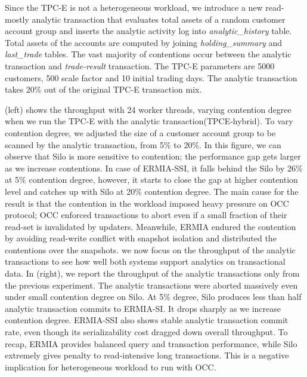 Since the TPC-E is not a heterogeneous workload, we introduce a new read-mostly analytic transaction that evaluates total assets of a random customer account group and inserts the analytic activity log into \textit{analytic\_history} table. Total assets of the accounts are computed by joining \textit{holding\_summary} and \textit{last\_trade} tables. The vast majority of contentions occur between the analytic transaction and \textit{trade-result} transaction. The TPC-E parameters are 5000 customers, 500 scale factor and 10 initial trading days. The analytic transaction takes 20\% out of the original TPC-E transaction mix. %


(left) shows the throughput with 24 worker threads, varying contention degree when we run the TPC-E with the analytic transaction(TPCE-hybrid). To vary contention degree, we adjusted the size of a customer account group to be scanned by the analytic transaction, from 5\% to 20\%. In this figure, we can observe that Silo is more sensitive to contention; the performance gap gets larger as we increase contentions. In case of ERMIA-SSI, it falls behind the Silo by 26\% at 5\% contention degree, however, it starts to close the gap at higher contention level and catches up with Silo at 20\% contention degree. 
The main cause for the result is that the contention in the workload imposed heavy pressure on OCC protocol; OCC enforced transactions to abort even if a small fraction of their read-set is invalidated by updaters. Meanwhile, ERMIA endured the contention by avoiding read-write conflict with snapshot isolation and distributed the contentions over the snapshots. 
we now focus on the throughput of the analytic transactions to see how well both systems support analytics on transactional data. In (right), we report the throughput of the analytic transactions only from the previous experiment. The analytic transactions were aborted massively even under small contention degree on Silo. At 5\% degree, Silo produces less than half analytic transaction commits to ERMIA-SI. It drops sharply as we increase contention degree. ERMIA-SSI also shows stable analytic transaction commit rate, even though its serializability cost dragged down overall throughput. To recap, ERMIA provides balanced query and transaction performance, while Silo extremely gives penalty to read-intensive long transactions. This is a negative implication for heterogeneous workload to run with OCC. 

